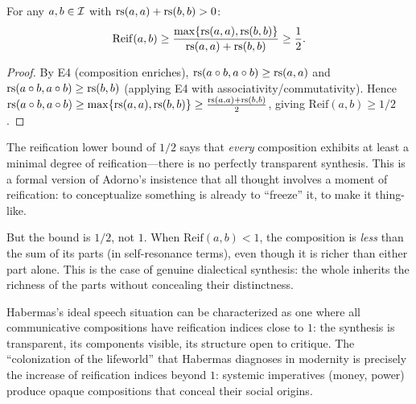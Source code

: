 \begin{theorem}
\label{thm:reification-lower-bound}
For any $a, b \in \mathcal{I}$ with $\mathrm{rs}(a, a) + \mathrm{rs}(b, b) > 0$:
\[
\mathrm{Reif}(a, b) \geq \frac{\max\{\mathrm{rs}(a,a), \mathrm{rs}(b,b)\}}{\mathrm{rs}(a,a) + \mathrm{rs}(b,b)} \geq \frac{1}{2}.
\]
\end{theorem}

\begin{proof}
By E4 (composition enriches), $\mathrm{rs}(a \circ b, a \circ b) \geq \mathrm{rs}(a, a)$
and $\mathrm{rs}(a \circ b, a \circ b) \geq \mathrm{rs}(b, b)$ (applying E4 with
associativity/commutativity). Hence $\mathrm{rs}(a \circ b, a \circ b)
\geq \max\{\mathrm{rs}(a,a), \mathrm{rs}(b,b)\} \geq \frac{\mathrm{rs}(a,a) + \mathrm{rs}(b,b)}{2}$,
giving $\mathrm{Reif}(a,b) \geq 1/2$.
\end{proof}

\begin{interpretation}
The reification lower bound of $1/2$ says that \emph{every} composition
exhibits at least a minimal degree of reification---there is no perfectly
transparent synthesis. This is a formal version of Adorno's insistence that
all thought involves a moment of reification: to conceptualize something is
already to ``freeze'' it, to make it thing-like.

But the bound is $1/2$, not $1$. When $\mathrm{Reif}(a,b) < 1$, the
composition is \emph{less} than the sum of its parts (in self-resonance
terms), even though it is richer than either part alone. This is the case
of genuine dialectical synthesis: the whole inherits the richness of the
parts without concealing their distinctness.

Habermas's ideal speech situation can be characterized as one where all
communicative compositions have reification indices close to $1$: the
synthesis is transparent, its components visible, its structure open to
critique. The ``colonization of the lifeworld'' that Habermas diagnoses
in modernity is precisely the increase of reification indices beyond $1$:
systemic imperatives (money, power) produce opaque compositions that
conceal their social origins.
\end{interpretation}

